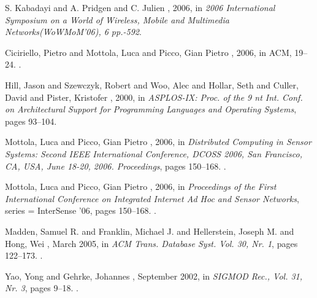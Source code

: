 \documentclass[USenglish]{uit-thesis}
\begin{document}
\begin{thebibliography}{9}

S. Kabadayi and A. Pridgen and C. Julien
, 2006,
\newblock in {\em 2006 International Symposium on a World of Wireless, Mobile and Multimedia Networks(WoWMoM'06), 6 pp.-592}.


Ciciriello, Pietro and Mottola, Luca and Picco, Gian Pietro
, 2006,
\newblock in {ACM, 19--24}.
.


Hill, Jason and Szewczyk, Robert and Woo, Alec and Hollar, Seth and Culler, David and Pister, Kristofer
, 2000,
\newblock in {\em  ASPLOS-IX: Proc. of the 9 nt Int. Conf. on
Architectural Support for Programming Languages and
Operating Systems}, pages 93–104.


Mottola, Luca and Picco, Gian Pietro
, 2006,
\newblock in {\em  Distributed Computing in Sensor Systems: Second IEEE International Conference, DCOSS 2006, San Francisco, CA, USA, June 18-20, 2006. Proceedings}, pages 150--168.
.


Mottola, Luca and Picco, Gian Pietro
, 2006,
\newblock in {\em  Proceedings of the First International Conference on Integrated Internet Ad Hoc and Sensor Networks},
 series = {InterSense '06}, pages 150--168.
.


Madden, Samuel R. and Franklin, Michael J. and Hellerstein, Joseph M. and Hong, Wei
, March 2005,
\newblock in {\em  ACM Trans. Database Syst. Vol. 30, Nr. 1}, pages 122--173.
.


Yao, Yong and Gehrke, Johannes
, September 2002,
\newblock in {\em  SIGMOD Rec., Vol. 31, Nr. 3}, pages 9--18.
.




\end{thebibliography}
\end{document}
